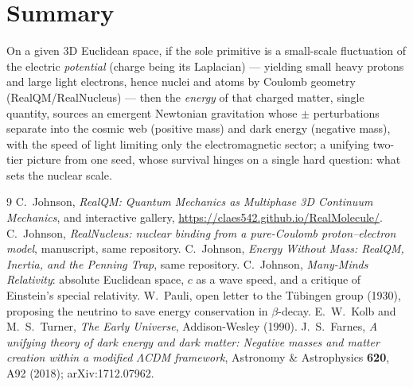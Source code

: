 \documentclass[11pt]{article}
\begin{document}
\section{Summary}\label{sec:summary}
\noindent On a given 3D Euclidean space, if the sole primitive is a small-scale fluctuation
of the electric \emph{potential} (charge being its Laplacian) --- yielding small heavy protons and large light
electrons, hence nuclei and atoms by Coulomb geometry
(RealQM/RealNucleus) --- then the \emph{energy} of that charged matter, single quantity, sources an emergent
Newtonian gravitation whose $\pm$ perturbations separate into the cosmic web (positive mass) and dark energy
(negative mass), with the speed of light limiting only the electromagnetic sector; a unifying two-tier picture from
one seed, whose survival hinges on a single hard question: what sets the nuclear scale.

\begin{thebibliography}{9}
 C.\ Johnson, \emph{RealQM: Quantum Mechanics as Multiphase 3D Continuum Mechanics}, and
interactive gallery, \url{https://claes542.github.io/RealMolecule/}.
 C.\ Johnson, \emph{RealNucleus: nuclear binding from a pure-Coulomb proton--electron model},
manuscript, same repository.
 C.\ Johnson, \emph{Energy Without Mass: RealQM, Inertia, and the Penning Trap}, same repository.
 C.\ Johnson, \emph{Many-Minds Relativity}: absolute Euclidean space, $c$ as a wave speed, and a
critique of Einstein's special relativity.
 W.\ Pauli, open letter to the Tübingen group (1930), proposing the neutrino to save energy
conservation in $\beta$-decay.
 E.\ W.\ Kolb and M.\ S.\ Turner, \emph{The Early Universe}, Addison-Wesley (1990).
 J.\ S.\ Farnes, \emph{A unifying theory of dark energy and dark matter: Negative masses and
matter creation within a modified $\Lambda$CDM framework}, Astronomy \& Astrophysics \textbf{620}, A92 (2018);
arXiv:1712.07962.
\end{thebibliography}
\end{document}
